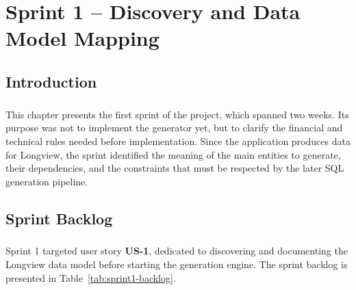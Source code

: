 ﻿\chapter{Sprint 1 -- Discovery and Data Model Mapping}

\section*{Introduction}

\paragraph{}This chapter presents the first sprint of the project, which spanned two weeks. Its purpose was not to
implement the generator yet, but to clarify the financial and technical rules needed before
implementation. Since the application produces data for Longview, the sprint identified the meaning
of the main entities to generate, their dependencies, and the constraints that must be respected by
the later SQL generation pipeline.


\section{Sprint Backlog}

\paragraph{}Sprint 1 targeted user story \textbf{US-1}, dedicated to discovering and documenting the
Longview data model before starting the generation engine. The sprint backlog is presented in
Table~\ref{tab:sprint1-backlog}.


